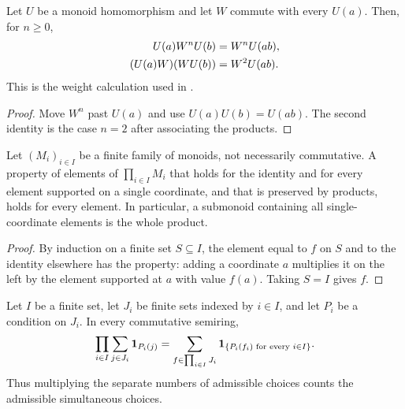 \begin{lemma}%
    \label{thm:peps_monoid_hom_commuting_weight}
    \leanok
    Let $U$ be a monoid homomorphism and let $W$ commute with every $U(a)$.
    Then, for $n\geq 0$,
    \begin{align}
        U(a)W^nU(b)    & =W^nU(ab), \notag \\
        (U(a)W)(WU(b)) & =W^2U(ab). \notag
    \end{align}
    This is the weight calculation used in \cite[Section~7]{Schuch2010PEPS}.
\end{lemma}

\begin{proof}\leanok
    Move $W^n$ past $U(a)$ and use $U(a)U(b)=U(ab)$.
    The second identity is the case $n=2$ after associating the products.
\end{proof}

\begin{lemma}%
    \label{thm:characters_mulsingle_induction}
    \leanok
    Let $(M_i)_{i\in I}$ be a finite family of monoids, not necessarily
    commutative. A property of elements of $\prod_{i\in I}M_i$ that holds
    for the identity and for every element supported on a single coordinate,
    and that is preserved by products, holds for every element. In
    particular, a submonoid containing all single-coordinate elements is
    the whole product.
\end{lemma}

\begin{proof}\leanok
    By induction on a finite set $S\subseteq I$, the element equal to $f$ on
    $S$ and to the identity elsewhere has the property: adding a coordinate
    $a$ multiplies it on the left by the element supported at $a$ with value
    $f(a)$. Taking $S=I$ gives $f$.
\end{proof}

\begin{lemma}%
    \label{thm:peps_finite_indicator_sum}
    \leanok
    Let $I$ be a finite set, let $J_i$ be finite sets indexed by $i\in I$,
    and let $P_i$ be a condition on $J_i$. In every commutative semiring,
    \begin{align}
        \prod_{i\in I}\sum_{j\in J_i}\mathbf1_{P_i(j)}
        =\sum_{f\in\prod_{i\in I}J_i}
        \mathbf1_{\{P_i(f_i)\text{ for every }i\in I\}}. \notag
    \end{align}
    Thus multiplying the separate numbers of admissible choices counts
    the admissible simultaneous choices.
\end{lemma}

